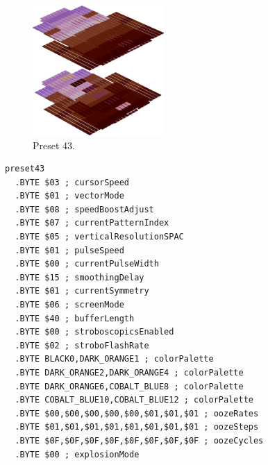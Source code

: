 \begin{minipage}[b]{0.48\linewidth}
\begin{figure}[H]                                                          
  \centering                                                             
  \begin{adjustbox}{width=5cm,center}                                   
  \includegraphics[width=5cm]{src/colorspace_presets/preset43-45.png}%
  \end{adjustbox}                                                        
\caption*{Preset 43.}                                           
\end{figure}                                                               
\end{minipage}
\hspace{0.1cm}
\begin{minipage}[b]{0.48\linewidth}                                       
\begin{lstlisting}[basicstyle=\ttfamily\tiny]
preset43
  .BYTE $03 ; cursorSpeed
  .BYTE $01 ; vectorMode
  .BYTE $08 ; speedBoostAdjust
  .BYTE $07 ; currentPatternIndex
  .BYTE $05 ; verticalResolutionSPAC
  .BYTE $01 ; pulseSpeed
  .BYTE $00 ; currentPulseWidth
  .BYTE $15 ; smoothingDelay
  .BYTE $01 ; currentSymmetry
  .BYTE $06 ; screenMode
  .BYTE $40 ; bufferLength
  .BYTE $00 ; stroboscopicsEnabled
  .BYTE $02 ; stroboFlashRate
  .BYTE BLACK0,DARK_ORANGE1 ; colorPalette
  .BYTE DARK_ORANGE2,DARK_ORANGE4 ; colorPalette
  .BYTE DARK_ORANGE6,COBALT_BLUE8 ; colorPalette
  .BYTE COBALT_BLUE10,COBALT_BLUE12 ; colorPalette
  .BYTE $00,$00,$00,$00,$00,$01,$01,$01 ; oozeRates
  .BYTE $01,$01,$01,$01,$01,$01,$01,$01 ; oozeSteps
  .BYTE $0F,$0F,$0F,$0F,$0F,$0F,$0F,$0F ; oozeCycles
  .BYTE $00 ; explosionMode
\end{lstlisting}
\end{minipage}

